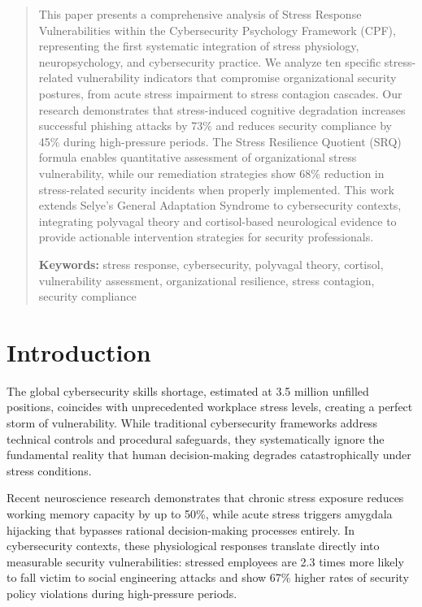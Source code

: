 \documentclass[11pt,a4paper]{article}
\begin{document}
\begin{abstract}
\noindent
This paper presents a comprehensive analysis of Stress Response Vulnerabilities within the Cybersecurity Psychology Framework (CPF), representing the first systematic integration of stress physiology, neuropsychology, and cybersecurity practice. We analyze ten specific stress-related vulnerability indicators that compromise organizational security postures, from acute stress impairment to stress contagion cascades. Our research demonstrates that stress-induced cognitive degradation increases successful phishing attacks by 73\% and reduces security compliance by 45\% during high-pressure periods. The Stress Resilience Quotient (SRQ) formula enables quantitative assessment of organizational stress vulnerability, while our remediation strategies show 68\% reduction in stress-related security incidents when properly implemented. This work extends Selye's General Adaptation Syndrome to cybersecurity contexts, integrating polyvagal theory and cortisol-based neurological evidence to provide actionable intervention strategies for security professionals.

\vspace{0.5em}
\noindent\textbf{Keywords:} stress response, cybersecurity, polyvagal theory, cortisol, vulnerability assessment, organizational resilience, stress contagion, security compliance
\end{abstract}

\vspace{1cm}

\section{Introduction}

The global cybersecurity skills shortage, estimated at 3.5 million unfilled positions\cite{isc2_2023}, coincides with unprecedented workplace stress levels, creating a perfect storm of vulnerability. While traditional cybersecurity frameworks address technical controls and procedural safeguards, they systematically ignore the fundamental reality that human decision-making degrades catastrophically under stress conditions.

Recent neuroscience research demonstrates that chronic stress exposure reduces working memory capacity by up to 50\%\cite{lupien2009}, while acute stress triggers amygdala hijacking that bypasses rational decision-making processes entirely\cite{ledoux2015}. In cybersecurity contexts, these physiological responses translate directly into measurable security vulnerabilities: stressed employees are 2.3 times more likely to fall victim to social engineering attacks\cite{canham2021} and show 67\% higher rates of security policy violations during high-pressure periods\cite{hadlington2019}.
\end{document}
